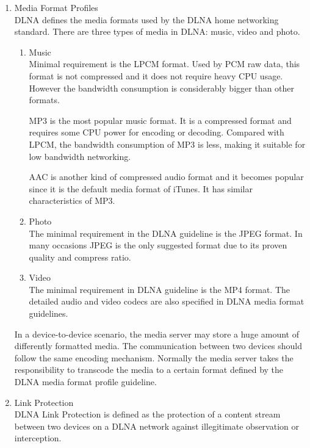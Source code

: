\begin{enumerate}
\item Media Format Profiles \\ 
DLNA defines the media formats used by the DLNA home networking 
standard. There are three types of media in DLNA: music, video and photo. 
\begin{enumerate} 
\item Music \\ 
Minimal requirement is the LPCM format. Used by PCM raw data, this format is not compressed and it does not require heavy CPU usage. However the bandwidth consumption is 
considerably bigger than other formats. 

MP3 is the most popular music format. It is a compressed format and requires 
some CPU power for encoding or decoding. Compared with LPCM, the bandwidth consumption of MP3 is less, making it suitable for low bandwidth networking. 

AAC is another kind of compressed audio format and it becomes popular since it is the default media format of iTunes. It has similar characteristics of MP3. 
\item Photo \\ 
The minimal requirement in the DLNA guideline is the JPEG format. In many occasions JPEG is the only suggested format due to its proven quality and compress ratio. 
\item Video \\ 
The minimal requirement in DLNA guideline is the MP4 format. The detailed audio and video codecs are also specified in DLNA media format guidelines. 
\end{enumerate} 
In a device-to-device scenario, the media server may store a huge amount of differently 
formatted media. The communication between two devices should follow the same encoding mechanism. Normally the media server takes the responsibility to transcode the media to a certain format defined by the DLNA media format profile guideline. 
\item Link Protection \\ 
DLNA Link Protection is defined as the protection of a content stream between two 
devices on a DLNA network against illegitimate observation or interception. 


\end{enumerate}
